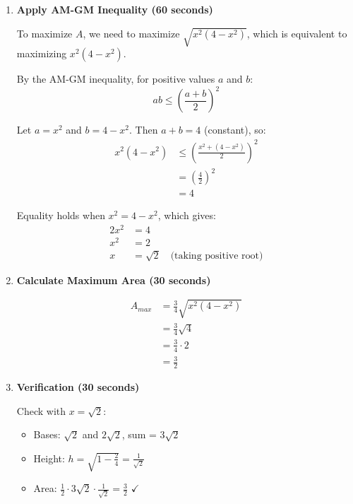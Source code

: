 \documentclass[12pt]{article}
\begin{document}
\begin{solutionbox}
\begin{enumerate}[leftmargin=*]
    \item \textbf{Apply AM-GM Inequality (60 seconds)}
    
    To maximize $A$, we need to maximize $\sqrt{x^2(4-x^2)}$, which is equivalent to maximizing $x^2(4-x^2)$.
    
    By the AM-GM inequality, for positive values $a$ and $b$:
    \begin{equation}
        ab \leq \left(\frac{a+b}{2}\right)^2
    \end{equation}
    
    Let $a = x^2$ and $b = 4-x^2$. Then $a + b = 4$ (constant), so:
    \begin{align*}
        x^2(4-x^2) &\leq \left(\frac{x^2 + (4-x^2)}{2}\right)^2 \\
        &= \left(\frac{4}{2}\right)^2 \\
        &= 4
    \end{align*}
    
    Equality holds when $x^2 = 4-x^2$, which gives:
    \begin{align*}
        2x^2 &= 4 \\
        x^2 &= 2 \\
        x &= \sqrt{2} \quad \text{(taking positive root)}
    \end{align*}
    
    \item \textbf{Calculate Maximum Area (30 seconds)}
    
    \begin{align*}
        A_{max} &= \frac{3}{4}\sqrt{x^2(4-x^2)} \\
        &= \frac{3}{4}\sqrt{4} \\
        &= \frac{3}{4} \cdot 2 \\
        &= \frac{3}{2}
    \end{align*}
    
    \item \textbf{Verification (30 seconds)}
    
    Check with $x = \sqrt{2}$:
    \begin{itemize}
        \item Bases: $\sqrt{2}$ and $2\sqrt{2}$, sum = $3\sqrt{2}$
        \item Height: $h = \sqrt{1-\frac{2}{4}} = \frac{1}{\sqrt{2}}$
        \item Area: $\frac{1}{2} \cdot 3\sqrt{2} \cdot \frac{1}{\sqrt{2}} = \frac{3}{2}$ $\checkmark$
    \end{itemize}
    

\end{enumerate}
\end{solutionbox}
\end{document}
